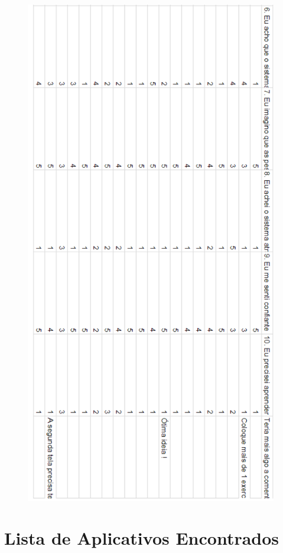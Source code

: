 \documentclass[
	12pt,				%
	openany,			%
	oneside,			%
	a4paper,			%
	english,			%
	french,				%
	spanish,			%
	brazil				%
	]{abntex2}
\begin{document}
\begin{apendicesenv}
\begin{figure}[H]
\includegraphics[width=11cm]{figuras/8.png}
\par

\end{figure}



\chapter{Lista de Aplicativos Encontrados}
\begin{figure}[H]
    \centering


\end{figure}
\end{apendicesenv}
\end{document}
